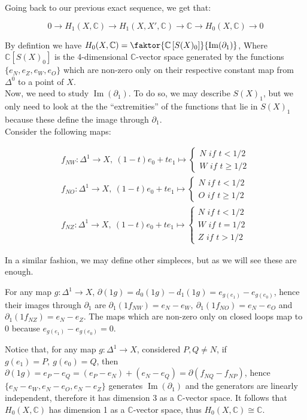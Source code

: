\documentclass{article}
\newcommand{\numberset}{\mathbb}
\newcommand{\C}{\numberset{C}}
\DeclareMathOperator{\Ima}{Im}
\begin{document}
Going back to our previous exact sequence, we get that:

$$0\rightarrow H_1(X,\C)\rightarrow H_1(X,X',\C)\rightarrow\C\rightarrow H_0(X,\C)\rightarrow 0$$

By defintion we have $H_{0}(X,\C)=\faktor{\mathbb{C}\left[S(X)_0\right]}{\Ima(\partial_{1})}$, Where $\mathbb{C}\left[S(X)_0\right]$ is the 4-dimensional $\mathbb{C}$-vector space generated by the functions $\{e_{N},e_{Z},e_{W},e_{O}\}$ which are non-zero only on their respective constant map from $\Delta^{0}$ to a point of $X$.\\
Now, we need to study $\Ima(\partial_{1})$. To do so, we may describe $S(X)_{1}$, but we only need to look at the the ``extremities'' of the functions that lie in $S(X)_{1}$ because these define the image through $\partial_1$.\\

Consider the following maps:

\begin{align*}
		f_{NW}:\Delta^1\rightarrow X,\ (1-t)e_0+te_1\mapsto\begin{cases}
			N\textit{ if } t<1/2 \\
			W\textit{ if } t\ge 1/2
		\end{cases} \\
		f_{NO}:\Delta^1\rightarrow X,\ (1-t)e_0+te_1\mapsto\begin{cases}
			N\textit{ if } t<1/2 \\
			O\textit{ if } t\ge 1/2
		\end{cases} \\
		f_{NZ}:\Delta^1\rightarrow X,\ (1-t)e_0+te_1\mapsto\begin{cases}
			N\textit{ if } t<1/2 \\
			W\textit{ if } t=1/2 \\
			Z\textit{ if } t>1/2
		\end{cases}
\end{align*}

In a similar fashion, we may define other simpleces, but as we will see these are enough.
		
For any map $g:\Delta^1\rightarrow X$, $\partial(1g)=d_0(1g)-d_1(1g)=e_{g(e_1)}-e_{g(e_0)}$, hence their images through $\partial_1$ are $\partial_1(1f_{NW})=e_N-e_W,\ \partial_1(1f_{NO})=e_N-e_O$ and $\partial_1(1f_{NZ})=e_N-e_Z$. The maps which are non-zero only on closed loops map to 0 because $e_{g(e_1)}-e_{g(e_0)}=0$.
		
Notice that, for any map $g:\Delta^1\rightarrow X$, considered $P,Q\neq N$, if $g(e_1)=P,\ g(e_0)=Q$, then $\partial(1g)=e_P-e_Q=(e_P-e_N)+(e_N-e_Q)=\partial(f_{NQ}-f_{NP})$, hence $\{e_N-e_W,e_N-e_O,e_N-e_Z\}$ generates $\Ima(\partial_1)$ and the generators are linearly independent, therefore it has dimension 3 as a $\C$-vector space. It follows that $H_0(X,\C)$ has dimension 1 as a $\C$-vector space, thus $H_0(X,\C)\cong\C$.
\end{document}
